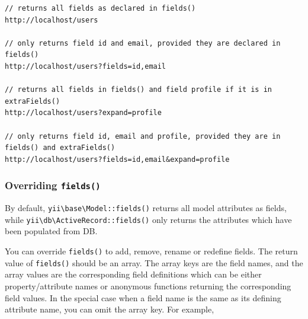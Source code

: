 \begin{lstlisting}
// returns all fields as declared in fields()
http://localhost/users

// only returns field id and email, provided they are declared in fields()
http://localhost/users?fields=id,email

// returns all fields in fields() and field profile if it is in extraFields()
http://localhost/users?expand=profile

// only returns field id, email and profile, provided they are in fields() and extraFields()
http://localhost/users?fields=id,email&expand=profile
\end{lstlisting}
\subsubsection{Overriding \lstinline|fields()| \label{rest-resources.md::overriding-fields}}
By default, \texttt{yii{\allowbreak{}\textbackslash}base{\allowbreak{}\textbackslash}Model\allowbreak{}::\allowbreak{}fields()} returns all model attributes as fields, while
\texttt{yii{\allowbreak{}\textbackslash}db{\allowbreak{}\textbackslash}ActiveRecord\allowbreak{}::\allowbreak{}fields()} only returns the attributes which have been populated from DB.

You can override \lstinline|fields()| to add, remove, rename or redefine fields. The return value of \lstinline|fields()|
should be an array. The array keys are the field names, and the array values are the corresponding
field definitions which can be either property/attribute names or anonymous functions returning the
corresponding field values. In the special case when a field name is the same as its defining attribute
name, you can omit the array key. For example,

